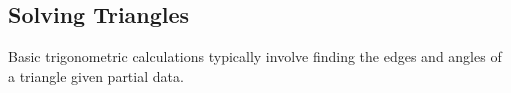 \clearpage

% 



\subsection{Solving Triangles}

Basic trigonometric calculations typically involve finding the edges and angles of a triangle given partial data.

